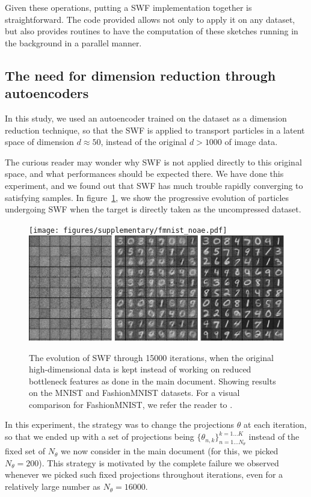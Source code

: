 Given these operations, putting a SWF implementation together is straightforward.
The code provided allows not only to apply it on any dataset, but also provides routines to have the computation of these sketches running in the background in a parallel manner.

\subsection{The need for dimension reduction through autoencoders}

In this study, we used an autoencoder trained on the dataset as a dimension reduction technique, so that the SWF is applied to transport particles in a latent space of dimension $d\approx 50$, instead of the original $d>1000$ of image data.

The curious reader may wonder why SWF is not applied directly to this original space, and what performances should be expected there. We have done this experiment, and we found out that SWF has much trouble rapidly converging to satisfying samples. In figure~\ref{fig:suppnoae}, we show the progressive evolution of particles undergoing SWF when the target is directly taken as the uncompressed dataset.

\begin{figure}
\centering
\texttt{[image: figures/supplementary/fmnist\_noae.pdf]}
\includegraphics[width=\columnwidth]{figures/supplementary/mnist_noae.pdf}
\caption{The evolution of SWF through 15000 iterations, when the original high-dimensional data is kept instead of working on reduced bottleneck features as done in the main document. Showing results on the MNIST and FashionMNIST datasets. For a visual comparison for FashionMNIST, we refer the reader to \cite{samangouei2018defensegan}.}
\label{fig:suppnoae}
\end{figure}

In this experiment, the strategy was to change the projections $\theta$ at each iteration, so that we ended up with a set of projections being $\{\theta_{n,k}\}_{n=1\dots N_\theta}^{k=1\dots K}$ instead of the fixed set of $N_\theta$ we now consider in the main document (for this, we picked $N_\theta=200$). This strategy is motivated by the complete failure we observed whenever we picked such fixed projections throughout iterations, even for a relatively large number as $N_\theta=16000$.


